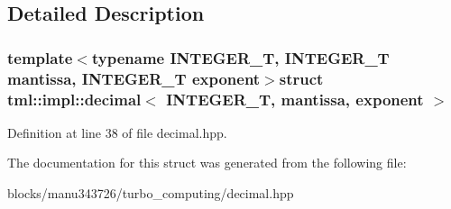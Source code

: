 \subsection{Detailed Description}
\subsubsection*{template$<$typename I\+N\+T\+E\+G\+E\+R\+\_\+\+T, I\+N\+T\+E\+G\+E\+R\+\_\+\+T mantissa, I\+N\+T\+E\+G\+E\+R\+\_\+\+T exponent$>$struct tml\+::impl\+::decimal$<$ I\+N\+T\+E\+G\+E\+R\+\_\+\+T, mantissa, exponent $>$}



Definition at line 38 of file decimal.\+hpp.



The documentation for this struct was generated from the following file\+:\begin{DoxyCompactItemize}
\item 
blocks/manu343726/turbo\+\_\+computing/decimal.\+hpp\end{DoxyCompactItemize}

